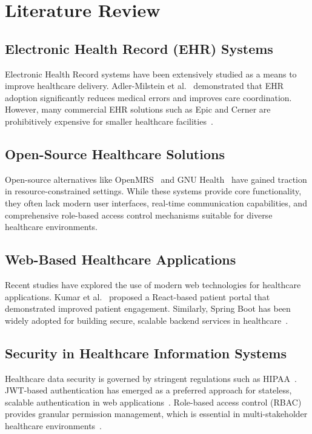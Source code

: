 \documentclass[conference]{IEEEtran}
\begin{document}
\section{Literature Review}

\subsection{Electronic Health Record (EHR) Systems}
Electronic Health Record systems have been extensively studied as a means to improve healthcare delivery. Adler-Milstein et al.~\cite{b1} demonstrated that EHR adoption significantly reduces medical errors and improves care coordination. However, many commercial EHR solutions such as Epic and Cerner are prohibitively expensive for smaller healthcare facilities~\cite{b3}.

\subsection{Open-Source Healthcare Solutions}
Open-source alternatives like OpenMRS~\cite{b4} and GNU Health~\cite{b5} have gained traction in resource-constrained settings. While these systems provide core functionality, they often lack modern user interfaces, real-time communication capabilities, and comprehensive role-based access control mechanisms suitable for diverse healthcare environments.

\subsection{Web-Based Healthcare Applications}
Recent studies have explored the use of modern web technologies for healthcare applications. Kumar et al.~\cite{b6} proposed a React-based patient portal that demonstrated improved patient engagement. Similarly, Spring Boot has been widely adopted for building secure, scalable backend services in healthcare~\cite{b7}.

\subsection{Security in Healthcare Information Systems}
Healthcare data security is governed by stringent regulations such as HIPAA~\cite{b8}. JWT-based authentication has emerged as a preferred approach for stateless, scalable authentication in web applications~\cite{b9}. Role-based access control (RBAC) provides granular permission management, which is essential in multi-stakeholder healthcare environments~\cite{b10}.
\end{document}
